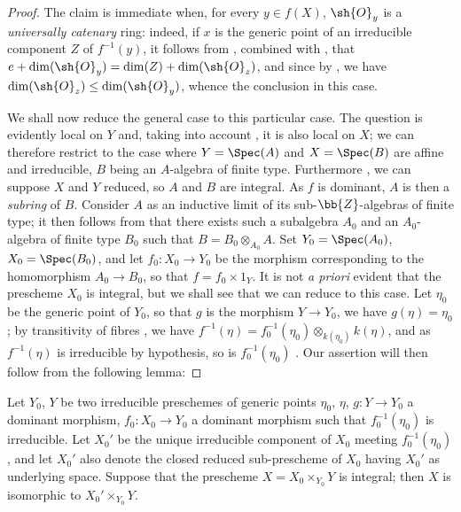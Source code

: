 \begin{proof}
The claim is immediate when, for every $y\in f(X)$, $\sh{O}_y$ is a \emph{universally catenary} ring: indeed, if $x$ is the generic point of an irreducible component $Z$ of $f^{-1}(y)$, it follows from , combined with , that $e+\dim(\sh{O}_y)=\dim(Z)+\dim(\sh{O}_z)$, and since by , we have $\dim(\sh{O}_z)\leq\dim(\sh{O}_y)$, whence the conclusion in this case.

We shall now reduce the general case to this particular case.
The question is evidently local on $Y$ and, taking into account , it is also local on $X$; we can therefore restrict to the case where $Y=\Spec(A)$ and $X=\Spec(B)$ are affine and irreducible, $B$ being an $A$-algebra of finite type.
Furthermore , we can suppose $X$ and $Y$ reduced, so $A$ and $B$ are integral.
As $f$ is dominant, $A$ is then a \emph{subring} of $B$.
Consider $A$ as an inductive limit of its sub-$\bb{Z}$-algebras of finite type; it then follows from  that there exists such a subalgebra $A_0$ and an $A_0$-algebra of finite type $B_0$ such that $B=B_0\otimes_{A_0}A$.
Set $Y_0=\Spec(A_0)$, $X_0=\Spec(B_0)$, and let $f_0:X_0\to Y_0$ be the morphism corresponding to the homomorphism $A_0\to B_0$, so that $f=f_0\times 1_Y$.
It is not \emph{a priori} evident that the prescheme $X_0$ is integral, but we shall see that we can reduce to this case.
Let $\eta_0$ be the generic point of $Y_0$, so that $g$ is the morphism $Y\to Y_0$, we have $g(\eta)=\eta_0$; by transitivity of fibres , we have $f^{-1}(\eta)=f_0^{-1}(\eta_0)\otimes_{k(\eta_0)}k(\eta)$, and as $f^{-1}(\eta)$ is irreducible by hypothesis, so is $f_0^{-1}(\eta_0)$ .
Our assertion will then follow from the following lemma:
\end{proof}

\begin{lemma}[13.1.2]
\label{IV.13.1.2}
Let $Y_0$, $Y$ be two irreducible preschemes of generic points $\eta_0$, $\eta$, $g:Y\to Y_0$ a dominant morphism, $f_0:X_0\to Y_0$ a dominant morphism such that $f_0^{-1}(\eta_0)$ is irreducible.
Let $X_0'$ be the unique irreducible component of $X_0$ meeting $f_0^{-1}(\eta_0)$ , and let $X_0'$ also denote the closed reduced sub-prescheme of $X_0$ having $X_0'$ as underlying space.
Suppose that the prescheme $X=X_0\times_{Y_0}Y$ is integral; then $X$ is isomorphic to $X_0'\times_{Y_0}Y$.
\end{lemma}

